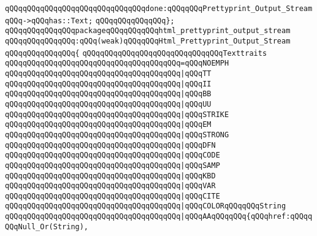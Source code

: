 \newline
\verb|qQQqqQQqqQQqqQQqqQQqqQQqqQQqqQQqdone:qQQqqQQqPrettyprint_Output_StreamqQQq->qQQqhas::Text;|\newline
\verb|qQQqqQQqqQQqqQQq};|\newline
\newline
\newline
\verb|qQQqqQQqqQQqqQQqpackageqQQqqQQqqQQqhtml_prettyprint_output_stream|\newline
\verb|qQQqqQQqqQQqqQQq:qQQq(weak)qQQqqQQqHtml_Prettyprint_Output_Stream|\newline
\verb|qQQqqQQqqQQqqQQq{|\newline
\verb|qQQqqQQqqQQqqQQqqQQqqQQqqQQqqQQqTexttraits|\newline
\verb|qQQqqQQqqQQqqQQqqQQqqQQqqQQqqQQqqQQqqQQq=qQQqNOEMPH|\newline
\verb|qQQqqQQqqQQqqQQqqQQqqQQqqQQqqQQqqQQqqQQq|\verb#|qQQqTT#\newline
\verb|qQQqqQQqqQQqqQQqqQQqqQQqqQQqqQQqqQQqqQQq|\verb#|qQQqII#\newline
\verb|qQQqqQQqqQQqqQQqqQQqqQQqqQQqqQQqqQQqqQQq|\verb#|qQQqBB#\newline
\verb|qQQqqQQqqQQqqQQqqQQqqQQqqQQqqQQqqQQqqQQq|\verb#|qQQqUU#\newline
\verb|qQQqqQQqqQQqqQQqqQQqqQQqqQQqqQQqqQQqqQQq|\verb#|qQQqSTRIKE#\newline
\verb|qQQqqQQqqQQqqQQqqQQqqQQqqQQqqQQqqQQqqQQq|\verb#|qQQqEM#\newline
\verb|qQQqqQQqqQQqqQQqqQQqqQQqqQQqqQQqqQQqqQQq|\verb#|qQQqSTRONG#\newline
\verb|qQQqqQQqqQQqqQQqqQQqqQQqqQQqqQQqqQQqqQQq|\verb#|qQQqDFN#\newline
\verb|qQQqqQQqqQQqqQQqqQQqqQQqqQQqqQQqqQQqqQQq|\verb#|qQQqCODE#\newline
\verb|qQQqqQQqqQQqqQQqqQQqqQQqqQQqqQQqqQQqqQQq|\verb#|qQQqSAMP#\newline
\verb|qQQqqQQqqQQqqQQqqQQqqQQqqQQqqQQqqQQqqQQq|\verb#|qQQqKBD#\newline
\verb|qQQqqQQqqQQqqQQqqQQqqQQqqQQqqQQqqQQqqQQq|\verb#|qQQqVAR#\newline
\verb|qQQqqQQqqQQqqQQqqQQqqQQqqQQqqQQqqQQqqQQq|\verb#|qQQqCITE#\newline
\verb|qQQqqQQqqQQqqQQqqQQqqQQqqQQqqQQqqQQqqQQq|\verb#|qQQqCOLORqQQqqQQqString#\newline
\verb|qQQqqQQqqQQqqQQqqQQqqQQqqQQqqQQqqQQqqQQq|\verb#|qQQqAAqQQqqQQq{qQQqhref:qQQqqQQqNull_Or(String),#\newline
